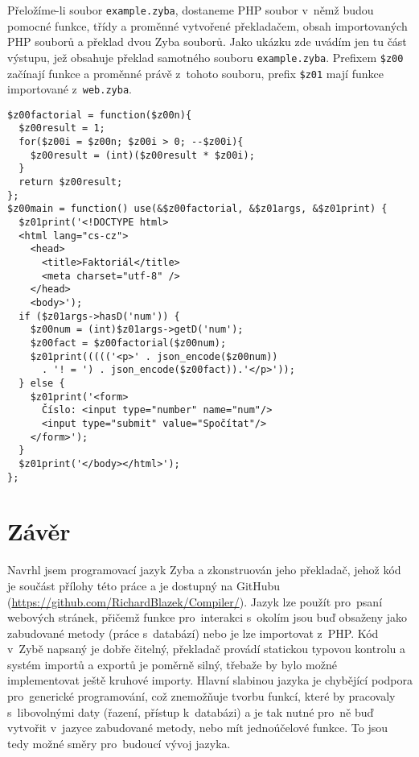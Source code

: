 \documentclass[a4paper,12pt]{article}
\begin{document}
Přeložíme-li soubor \texttt{example.zyba}, dostaneme PHP soubor v~němž budou pomocné funkce, třídy a proměnné vytvořené překladačem, obsah importovaných PHP souborů a překlad dvou Zyba souborů. Jako ukázku zde uvádím jen tu část výstupu, jež obsahuje překlad samotného souboru \texttt{example.zyba}. Prefixem \texttt{\$z00} začínají funkce a proměnné právě z~tohoto souboru, prefix \texttt{\$z01} mají funkce importované z~\texttt{web.zyba}.

\begin{verbatim}
$z00factorial = function($z00n){
  $z00result = 1;
  for($z00i = $z00n; $z00i > 0; --$z00i){
    $z00result = (int)($z00result * $z00i);
  }
  return $z00result;
};
$z00main = function() use(&$z00factorial, &$z01args, &$z01print) {
  $z01print('<!DOCTYPE html>
  <html lang="cs-cz">
    <head>
      <title>Faktoriál</title>
      <meta charset="utf-8" />
    </head>
    <body>');
  if ($z01args->hasD('num')) {
    $z00num = (int)$z01args->getD('num');
    $z00fact = $z00factorial($z00num);
    $z01print((((('<p>' . json_encode($z00num))
      . '! = ') . json_encode($z00fact)).'</p>'));
  } else {
    $z01print('<form>
      Číslo: <input type="number" name="num"/>
      <input type="submit" value="Spočítat"/>
    </form>');
  }
  $z01print('</body></html>');
};
\end{verbatim}

\section{Závěr}
Navrhl jsem programovací jazyk Zyba a zkonstruován jeho překladač, jehož kód je součást přílohy této práce a je dostupný na GitHubu (\url{https://github.com/RichardBlazek/Compiler/}). Jazyk lze použít pro~psaní webových stránek, přičemž funkce pro~interakci s~okolím jsou buď obsaženy jako zabudované metody (práce s~databází) nebo je lze importovat z~PHP. Kód v~Zybě napsaný je dobře čitelný, překladač provádí statickou typovou kontrolu a systém importů a exportů je poměrně silný, třebaže by bylo možné implementovat ještě kruhové importy. Hlavní slabinou jazyka je chybějící podpora pro~generické programování, což znemožňuje tvorbu funkcí, které by pracovaly s~libovolnými daty (řazení, přístup k~databázi) a je tak nutné pro~ně buď vytvořit v~jazyce zabudované metody, nebo mít jednoúčelové funkce. To jsou tedy možné směry pro~budoucí vývoj jazyka.

\newpage
\printbibliography[heading=bibintoc, title={Použitá literatura}]
\newpage
\end{document}
